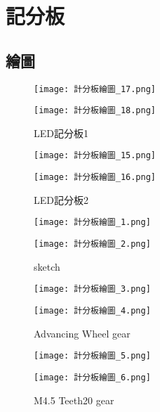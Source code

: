 \chapter{記分板}
\section{繪圖}
{
\begin{figure}[hbt!]
  \centering
  \texttt{[image: 計分板繪圖\_17.png]}
\end{figure}
\begin{figure}[hbt!]
  \centering
  \texttt{[image: 計分板繪圖\_18.png]}
  \caption{LED記分板1}
  \label{fig:photo1}
\end{figure}

\begin{figure}[hbt!]
  \centering
  \texttt{[image: 計分板繪圖\_15.png]}
\end{figure}
\begin{figure}[hbt!]
  \centering
  \texttt{[image: 計分板繪圖\_16.png]}
  \caption{LED記分板2}
  \label{fig:photo2}
\end{figure}

\begin{figure}[hbt!]
  \centering
  \texttt{[image: 計分板繪圖\_1.png]}
\end{figure}
\begin{figure}[hbt!]
  \centering
  \texttt{[image: 計分板繪圖\_2.png]}
  \caption{sketch}
  \label{fig:photo3}
\end{figure}

\begin{figure}[hbt!]
  \centering
  \texttt{[image: 計分板繪圖\_3.png]}
\end{figure}
\begin{figure}[hbt!]
  \centering
  \texttt{[image: 計分板繪圖\_4.png]}
  \caption{Advancing Wheel gear}
  \label{fig:photo4}
\end{figure}

\begin{figure}[hbt!]
  \centering
  \texttt{[image: 計分板繪圖\_5.png]}
\end{figure}
\begin{figure}[hbt!]
  \centering
  \texttt{[image: 計分板繪圖\_6.png]}
  \caption{M4.5 Teeth20 gear}
  \label{fig:photo5}
\end{figure}

}
